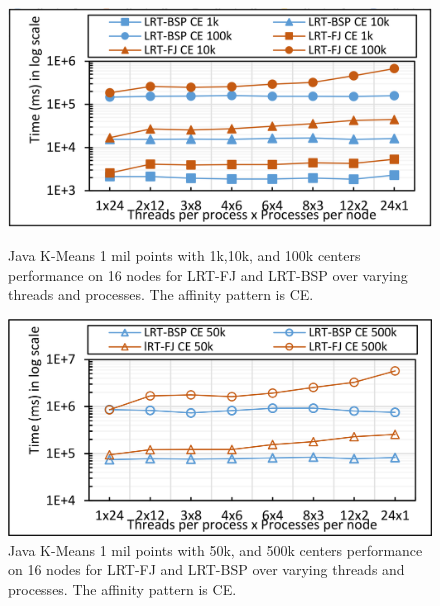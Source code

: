 \documentclass[10pt, conference, compsocconf]{IEEEtran}
\begin{document}
\begin{figure}[!htb]
	\begin{minipage}{0.49\textwidth}
        \centering
        \includegraphics[width=1\columnwidth]{images/fig_kmeans_1mil_varying_centers_by_10k_FJ_vs_BSP_T}
        \caption{Java K-Means 1 mil points with 1k,10k, and 100k centers performance on 16 nodes for \ac{LRT-FJ} and \ac{LRT-BSP} over varying threads and processes. The affinity pattern is CE.}
        \label{fig:fig_kmeans_1mil_varying_centers_by_10k_FJ_vs_BSP_T}
    \end{minipage}
    \hspace{1.4mm}
    \begin{minipage}{0.49\textwidth}
        \centering
        \includegraphics[width=1\columnwidth]{images/fig_kmeans_1mil_varying_centers_as_50k_500k_FJ_vs_BSP_T}
        \caption{Java K-Means 1 mil points with 50k, and 500k centers performance on 16 nodes for \ac{LRT-FJ} and \ac{LRT-BSP} over varying threads and processes. The affinity pattern is CE.}
        \label{fig:fig_kmeans_1mil_varying_centers_as_50k_500k_FJ_vs_BSP_T}
    \end{minipage}
\end{figure}
\end{document}
